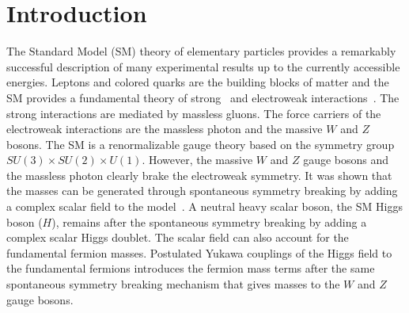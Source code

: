 
\chapter{Introduction}

The Standard Model (SM) theory of elementary particles provides a remarkably successful description of many experimental results up to the currently accessible energies. Leptons and colored quarks are the building blocks of matter and the SM provides a fundamental theory of strong~\cite{Politzer:1973fx,Gross:1973id} and electroweak interactions~\cite{Glashow:1961tr,Weinberg:1967tq,Salam:1968rm}. The strong interactions are mediated by massless gluons. The force carriers of the electroweak interactions are the massless photon and the massive $W$ and $Z$ bosons. The SM is a renormalizable gauge theory based on the symmetry group $SU(3) \times SU(2) \times U(1)$. However, the massive $W$ and $Z$ gauge bosons and the massless photon clearly brake the electroweak symmetry. It was shown that the masses can be generated through spontaneous symmetry breaking by adding a complex scalar field to the model~\cite{Englert:1964et,Higgs:1964ia,Higgs:1964pj,Guralnik:1964eu,Higgs:1966ev,Kibble:1967sv}. A neutral heavy scalar boson, the SM Higgs boson ($H$), remains after the spontaneous symmetry breaking by adding a complex scalar Higgs doublet. The scalar field can also account for the fundamental fermion masses. Postulated Yukawa couplings of the Higgs field to the fundamental fermions introduces the fermion mass terms after the same spontaneous symmetry breaking mechanism that gives masses to the $W$ and $Z$ gauge bosons. 

